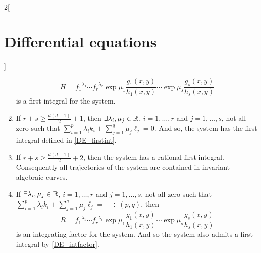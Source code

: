 \documentclass[../../../main_math.tex]{subfiles}
\begin{document}
\begin{multicols}{2}[\section{Differential equations}]
\begin{theorem}
\begin{enumerate}
            \begin{equation}\label{DE_firstint}
              H={f_1}^{\lambda_1}\cdots{f_r}^{\lambda_r}\exp{\mu_1\frac{g_1(x,y)}{h_1(x,y)}}\cdots\exp{\mu_s\frac{g_s(x,y)}{h_s(x,y)}}
            \end{equation}
            is a first integral for the system.
      \item If $r+s\geq \frac{d(d+1)}{2}+1$, then $\exists \lambda_i,\mu_j\in\mathbb{R}$, $i=1,\ldots,r$ and $j=1,\ldots,s$, not all zero such that $\sum_{i=1}^p\lambda_ik_i+\sum_{j=1}^q\mu_j\ell_j=0$. And so, the system has the first integral defined in \cref{DE_firstint}.
      \item If $r+s\geq \frac{d(d+1)}{2}+2$, then the system has a rational first integral. Consequently all trajectories of the system are contained in
            invariant algebraic curves.
      \item If $\exists \lambda_i,\mu_j\in\mathbb{R}$, $i=1,\ldots,r$ and $j=1,\ldots,s$, not all zero such that $\sum_{i=1}^p\lambda_ik_i+\sum_{j=1}^q\mu_j\ell_j=-\div(p,q)$, then
            \begin{equation*}
              R={f_1}^{\lambda_1}\cdots{f_r}^{\lambda_r}\exp{\mu_1\frac{g_1(x,y)}{h_1(x,y)}}\cdots\exp{\mu_s\frac{g_s(x,y)}{h_s(x,y)}}
            \end{equation*}
            is an integrating factor for the system. And so the system also admits a first integral by \cref{DE_intfactor}.
    \end{enumerate}
  \end{theorem}

\end{multicols}
\end{document}
